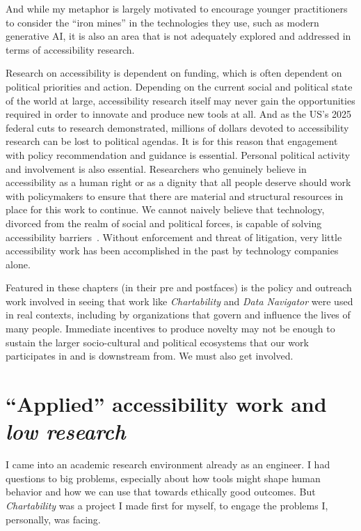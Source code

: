 \documentclass[12pt]{cmuthesis}
\begin{document}
And while my metaphor is largely motivated to encourage younger practitioners to consider the ``iron mines'' in the technologies they use, such as modern generative AI, it is also an area that is not adequately explored and addressed in terms of accessibility research.

Research on accessibility is dependent on funding, which is often dependent on political priorities and action. Depending on the current social and political state of the world at large, accessibility research itself may never gain the opportunities required in order to innovate and produce new tools at all. And as the US's 2025 federal cuts to research demonstrated, millions of dollars devoted to accessibility research can be lost to political agendas. It is for this reason that engagement with policy recommendation and guidance is essential. Personal political activity and involvement is also essential. Researchers who genuinely believe in accessibility as a human right or as a dignity that all people deserve should work with policymakers to ensure that there are material and structural resources in place for this work to continue. We cannot naively believe that technology, divorced from the realm of social and political forces, is capable of solving accessibility barriers~\cite{Spiel2020}. Without enforcement and threat of litigation, very little accessibility work has been accomplished in the past by technology companies alone.

Featured in these chapters (in their pre and postfaces) is the policy and outreach work involved in seeing that work like \textit{Chartability} and \textit{Data Navigator} were used in real contexts, including by organizations that govern and influence the lives of many people. Immediate incentives to produce novelty may not be enough to sustain the larger socio-cultural and political ecosystems that our work participates in and is downstream from. We must also get involved.

\section{``Applied'' accessibility work and \textit{low research}}
I came into an academic research environment already as an engineer. I had questions to big problems, especially about how tools might shape human behavior and how we can use that towards ethically good outcomes. But \textit{Chartability} was a project I made first for myself, to engage the problems I, personally, was facing.
\end{document}
